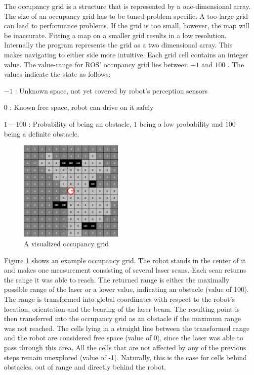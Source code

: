 \documentclass{ba-kecs}
\begin{document}
The occupancy grid is a structure that is represented by a one-dimensional array. The size of an occupancy grid has to be tuned problem specific. A too large grid can lead to performance problems. If the grid is too small, however, the map will be inaccurate. Fitting a map on a smaller grid results in a low resolution.
Internally the program represents the grid as a two dimensional array. This makes navigating to either side more intuitive. Each grid cell contains an integer value. The value-range for ROS' occupancy grid lies between $-1$ and $100$ \cite{occupancy}. The values indicate the state as follows:
\begin{description}
\item{$-1$} : Unknown space, not yet covered by robot's perception sensors
\item{$0$} : Known free space, robot can drive on it safely
\item{$1-100$} : Probability of being an obstacle, $1$ being a low probability and $100$ being a definite obstacle.
\end{description}
\begin{figure}[htbp]
	\centering
		\includegraphics[width=0.45\textwidth]{figures/Occup.png}
	\caption{A visualized occupancy grid}
	\label{fig:Occupancy}
\end{figure}
Figure \ref{fig:Occupancy} shows an example occupancy grid. The robot stands in the center of it and makes one measurement consisting of several laser scans. Each scan returns the range it was able to reach. The returned range is either the maximally possible range of the laser or a lower value, indicating an obstacle (value of 100). The range is transformed into global coordinates with respect to the robot's location, orientation and the bearing of the laser beam. The resulting point is then transferred into the occupancy grid as an obstacle if the maximum range was not reached. The cells lying in a straight line between the transformed range and the robot are considered free space (value of 0), since the laser was able to pass through this area. All the cells that are not affected by any of the previous steps remain unexplored (value of -1). Naturally, this is the case for cells behind obstacles, out of range and directly behind the robot.
\end{document}
